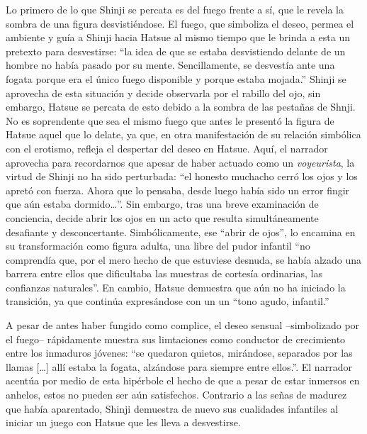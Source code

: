 Lo primero de lo que Shinji se percata es del fuego frente a sí, que le revela la sombra de una figura desvistiéndose. El fuego, que simboliza el deseo, permea el ambiente y guía a Shinji hacia Hatsue al mismo tiempo que le brinda a esta un pretexto para desvestirse: ``la idea de que se estaba desvistiendo delante de un hombre no había pasado por su mente. Sencillamente, se desvestía ante una fogata porque era el único fuego disponible y porque estaba mojada.'' \autocite{mishima2006}
Shinji se aprovecha de esta situación y decide observarla por el rabillo del ojo, sin embargo, Hatsue se percata de esto debido a la sombra de las pestañas de Shnji.
No es soprendente que sea el mismo fuego que antes le presentó la figura de Hatsue aquel que lo delate, ya que, en otra manifestación de su relación simbólica con el erotismo, refleja el despertar del deseo en Hatsue.
Aquí, el narrador aprovecha para recordarnos que apesar de haber actuado como un \emph{voyeurista}, la virtud de Shinji no ha sido perturbada: ``el honesto muchacho cerró los ojos y los apretó con fuerza. Ahora que lo pensaba, desde luego había sido un error fingir que aún estaba dormido\ldots''\autocite{mishima2006}.
Sin embargo, tras una breve examinación de conciencia, decide abrir los ojos en un acto que resulta simultáneamente desafiante y desconcertante.
Simbólicamente, ese ``abrir de ojos'', lo encamina en su transformación como figura adulta, una libre del pudor infantil ``no comprendía que, por el mero hecho de que estuviese desnuda, se había alzado una barrera entre ellos que dificultaba las muestras de cortesía ordinarias, las confianzas naturales''.\autocite{mishima2006}
En cambio, Hatsue demuestra que aún no ha iniciado la transición, ya que continúa expresándose con un un ``tono agudo, infantil.''\autocite{mishima2006}

A pesar de antes haber fungido como complice, el deseo sensual --simbolizado por el fuego-- rápidamente muestra sus limtaciones como conductor de crecimiento entre los inmaduros jóvenes: ``se quedaron quietos, mirándose, separados por las llamas [\ldots] allí estaba la fogata, alzándose para siempre entre ellos.''.\autocite{mishima2006}
El narrador acentúa por medio de esta hipérbole el hecho de que a pesar de estar inmersos en anhelos, estos no pueden ser aún satisfechos. Contrario a las señas de madurez que había aparentado, Shinji demuestra de nuevo sus cualidades infantiles al iniciar un juego con Hatsue que les lleva a desvestirse.

